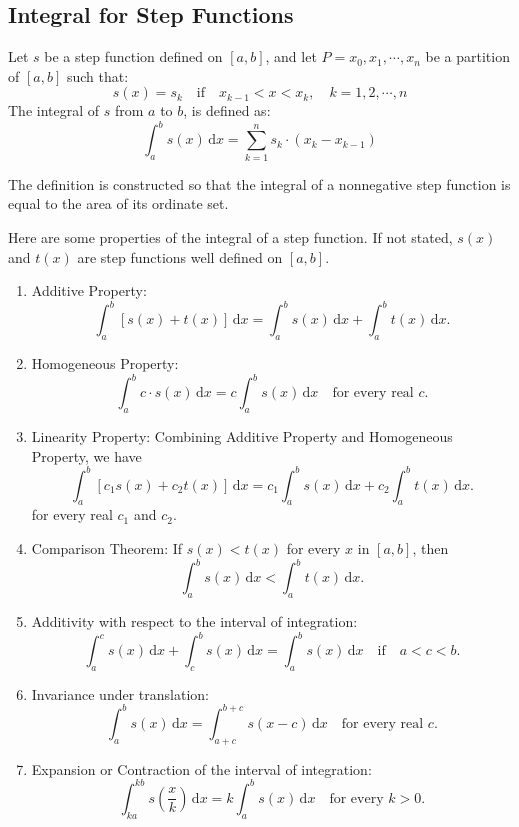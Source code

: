 \documentclass[a4paper]{ctexart}
\begin{document}
	\subsection{Integral for Step Functions}
	\begin{mydef}
		Let $s$ be a step function defined on $[a,b]$, and let $P={x_0,x_1,\cdots,x_n}$ be a partition of $[a,b]$ such that:
		\[
		s(x)=s_k \quad \text{if}\quad x_{k-1}<x<x_k,\quad k=1,2,\cdots,n
		\]
		The integral of $s$ from $a$ to $b$, is defined as:
		\[
		\int_{a}^{b}s(x)\,\mathrm{d}x=\sum_{k=1}^{n}s_k\cdot (x_k - x_{k-1})
		\]
	\end{mydef}
	\begin{myrmk}
		The definition is constructed so that the integral of a nonnegative step function is equal to the area of its ordinate set.
	\end{myrmk}
	\begin{mythm}
		Here are some properties of the integral of a step function. If not stated, $s(x)$ and $t(x)$ are step functions well defined on $[a,b]$.
		\begin{enumerate}
			\item Additive Property:
			\[
			\int_{a}^{b}\left[s(x)+t(x)\right]\,\mathrm{d}x=\int_{a}^{b}s(x)\,\mathrm{d}x+\int_{a}^{b}t(x)\,\mathrm{d}x.
			\]
			\item Homogeneous Property: 
			\[
			\int_a^b c \cdot s(x) \, \mathrm{d}x = c \int_a^b s(x) \, \mathrm{d}x \quad \text{for every real } c.
			\]
			\item Linearity Property: Combining Additive Property and Homogeneous Property, we have
			\[
			\int_a^b \left[ c_1 s(x) + c_2 t(x) \right] \, \mathrm{d}x
			= c_1 \int_a^b s(x) \, \mathrm{d}x + c_2 \int_a^b t(x) \, \mathrm{d}x.
			\]
			for every real $c_1$ and $c_2$.
			\item Comparison Theorem: If $s(x)<t(x)$ for every $x$ in $[a,b]$, then
			\[
			\int_a^b s(x) \, \mathrm{d}x < \int_a^b t(x) \, \mathrm{d}x.
			\]
			\item Additivity with respect to the interval of integration:
			\[
			\int_a^c s(x) \, \mathrm{d}x + \int_c^b s(x) \, \mathrm{d}x = \int_a^b s(x) \, \mathrm{d}x 
			\quad \text{if} \quad a < c < b.
			\]
			\item  Invariance under translation:
			\[
			\int_a^b s(x) \, \mathrm{d}x = \int_{a+c}^{b+c} s(x - c) \, \mathrm{d}x 
			\quad \text{for every real } c.
			\]
			\item Expansion or Contraction of the interval of integration:
			\[
			\int_{ka}^{kb} s\!\left(\frac{x}{k}\right) \, \mathrm{d}x = 
			k \int_a^b s(x) \, \mathrm{d}x 
			\quad \text{for every } k > 0.
			\]
		\end{enumerate}
	\end{mythm}
\end{document}
